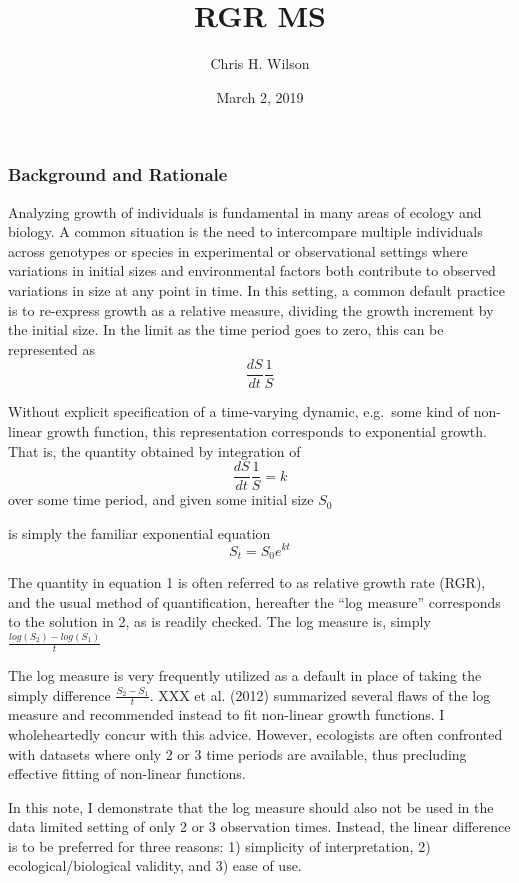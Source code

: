 \documentclass[]{article}
\title{RGR MS}
\author{Chris H. Wilson}
\date{March 2, 2019}
\begin{document}
\maketitle

\subsubsection{Background and Rationale}\label{background-and-rationale}

Analyzing growth of individuals is fundamental in many areas of ecology
and biology. A common situation is the need to intercompare multiple
individuals across genotypes or species in experimental or observational
settings where variations in initial sizes and environmental factors
both contribute to observed variations in size at any point in time. In
this setting, a common default practice is to re-express growth as a
relative measure, dividing the growth increment by the initial size. In
the limit as the time period goes to zero, this can be represented as
\[\frac{dS}{dt}\frac{1}{S}\]

Without explicit specification of a time-varying dynamic, e.g.~some kind
of non-linear growth function, this representation corresponds to
exponential growth. That is, the quantity obtained by integration of
\[\frac{dS}{dt}\frac{1}{S} = k\] over some time period, and given some
initial size \(S_0\)

is simply the familiar exponential equation \[S_t = S_0e^{kt}\]

The quantity in equation 1 is often referred to as relative growth rate
(RGR), and the usual method of quantification, hereafter the ``log
measure'' corresponds to the solution in 2, as is readily checked. The
log measure is, simply \(\frac{log(S_2) - log(S_1)}{t}\)

The log measure is very frequently utilized as a default in place of
taking the simply difference \(\frac{S_2 - S_1}{t}\). XXX et al. (2012)
summarized several flaws of the log measure and recommended instead to
fit non-linear growth functions. I wholeheartedly concur with this
advice. However, ecologists are often confronted with datasets where
only 2 or 3 time periods are available, thus precluding effective
fitting of non-linear functions.

In this note, I demonstrate that the log measure should also not be used
in the data limited setting of only 2 or 3 observation times. Instead,
the linear difference is to be preferred for three reasons: 1)
simplicity of interpretation, 2) ecological/biological validity, and 3)
ease of use.
\end{document}
